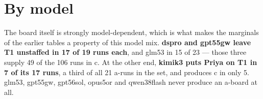 \documentclass[11pt,a4paper]{article}
\begin{document}
\section{By model}

\begin{table}[htbp]
\centering
\small
\caption{(vii) Board outcome by model, all 180 operative runs.}
\label{tab:vii}
\end{table}

The board itself is strongly model-dependent, which is what makes the marginals of the earlier
tables a property of this model mix. \textbf{dspro and gpt55gw leave T1 unstaffed in 17 of 19 runs
each}, and glm53 in 15 of 23 --- those three supply 49 of the 106 runs in c. At the other end,
\textbf{kimik3 puts Priya on T1 in 7 of its 17 runs}, a third of all 21 a-runs in the set, and
produces c in only 5. glm53, gpt55gw, gpt56sol, opus5or and qwen38flash never produce an a-board at
all.
\end{document}

